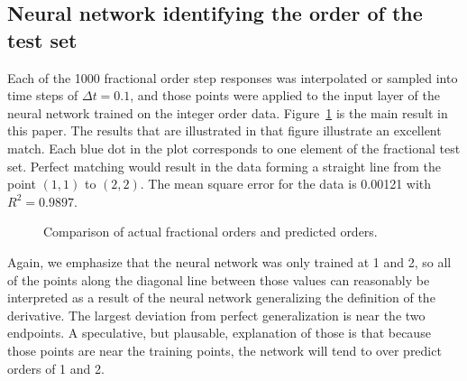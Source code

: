 \subsection{Neural network identifying the order of the test set}

Each of the 1000 fractional order step responses was interpolated or sampled
into time steps of $\Delta t = 0.1$, and those points were applied to the input
layer of the neural network trained on the integer order data.
Figure~\ref{fig:accuracy} is the main result in this paper.  The results that
are illustrated in that figure illustrate an excellent match. Each blue dot in
the plot corresponds to one element of the fractional test set.  Perfect
matching would result in the data forming a straight line from the point $(1,1)$
to $(2,2)$. The mean square error for the data is 0.00121 with $R^2 = 0.9897$.

\begin{figure}
\centering

\vspace*{-5pt}
\caption{Comparison of actual fractional orders and predicted orders.}
\label{fig:accuracy}
\end{figure}

Again, we emphasize that the neural network was only trained at 1 and 2, so all
of the points along the diagonal line between those values can reasonably be
interpreted as a result of the neural network generalizing the definition of the
derivative. The largest deviation from perfect generalization is near the two
endpoints. A speculative, but plausable, explanation of those is that because
those points are near the training points, the network will tend to over predict
orders of 1 and 2.
